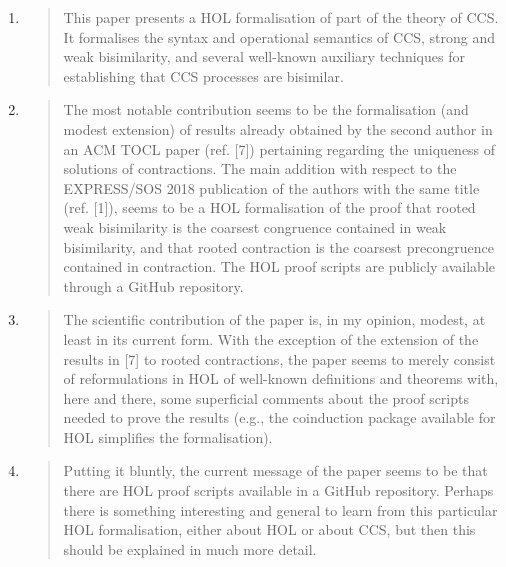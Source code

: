 \begin{enumerate}
\item \begin{quote}
    This paper presents a HOL formalisation of part of the theory of
    CCS. It formalises the syntax and operational semantics of CCS,
    strong and weak bisimilarity, and several well-known auxiliary
    techniques for establishing that CCS processes are bisimilar.
  \end{quote}

\item \begin{quote}
    The most notable contribution seems to be the formalisation (and
    modest extension) of results already obtained by the second author
    in an ACM TOCL paper (ref. [7]) pertaining regarding the
    uniqueness of solutions of contractions. The main addition with
    respect to the EXPRESS/SOS 2018 publication of the authors with
    the same title (ref. [1]), seems to be a HOL formalisation of the
    proof that rooted weak bisimilarity is the coarsest congruence
    contained in weak bisimilarity, and that rooted contraction is the
    coarsest precongruence contained in contraction. The HOL proof
    scripts are publicly available through a GitHub repository.
  \end{quote}

\item \begin{quote}
    The scientific contribution of the paper is, in my opinion,
    modest, at least in its current form. With the exception of the
    extension of the results in [7] to rooted contractions, the paper
    seems to merely consist of reformulations in HOL of well-known
    definitions and theorems with, here and there, some superficial
    comments about the proof scripts needed to prove the results
    (e.g., the coinduction package available for HOL simplifies the
    formalisation).
  \end{quote}

\item \begin{quote}
    Putting it bluntly, the current message of the paper seems to be
    that there are HOL proof scripts available in a GitHub
    repository. Perhaps there is something interesting and general to
    learn from this particular HOL formalisation, either about HOL or
    about CCS, but then this should be explained in much more detail.
  \end{quote}


\end{enumerate}

